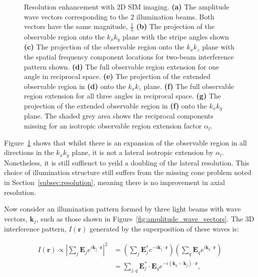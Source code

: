\begin{figure}
\begin{subfigure}[t]{0.5\textwidth}
		\caption{}
		\label{fig:3D_SIM_OTF_xy_expansion_w_double_rad_filled}
	\end{subfigure}
	\caption[Resolution enhancement with 2D SIM imaging]{Resolution enhancement 
		with 2D SIM imaging. \textbf{(a)} The amplitude wave vectors 
		corresponding to the 2 illumination beams. Both vectors have the 
		same magnitude, $\frac{1}{\lambda}$ \textbf{(b)} The projection of the 
		observable region onto the $k_{x}k_{y}$ plane with the stripe angles 
		shown \textbf{(c)} The projection of the observable region onto the 
		$k_{x}k_{z}$ plane with the spatial frequency component locations for
		two-beam interference pattern shown. \textbf{(d)} The full observable region 
		extension for one angle in reciprocal space. \textbf{(e)} The projection 
		of the extended observable region in \textbf{(d)} onto the $k_{x}k_{z}$ 
		plane. \textbf{(f)} The full observable region extension for all three angles in 
		reciprocal space. \textbf{(g)} The projection of the extended observable 
		region in \textbf{(f)} onto the $k_{x}k_{y}$ plane. The shaded grey area
		shows the reciprocal components missing for an isotropic observable region
		extension factor $\alpha_{l}$.}
	\label{fig:2D_SIM_visualisation}
\end{figure}

Figure~\ref{fig:3D_SIM_OTF_xy_expansion_w_double_rad_filled} shows
that whilst there is an expansion of the observable region in all
directions in the $k_{x}k_{y}$ plane, it is not a lateral isotropic 
extension by $\alpha_{l}$. Nonetheless, it is still suffienct to yeild 
a doubling of the lateral resolution\cite{gustafsson2000surpassing}.
This choice of illumination structure still suffers from the missing
cone problem noted in Section~\ref{subsec:resolution}, meaning there
is no improvement in axial resolution.

Now consider an illumination pattern formed by three light beams with
wave vectors, $\textbf{k}_{j}$, such as those shown in 
Figure~\ref{fig:amplitude_wave_vectors}. The 3D interference pattern, 
$I(\textbf{r})$ generated by the superposition of these waves is:

\begin{equation}\label{eq:3_beam_interference}
	\begin{split}
		I(\textbf{r}) \propto \left|\sum\limits_{j}{\textbf{E}_{j}e^{i\textbf{k}_j\cdot\textbf{r}}}\right|^{2} &= \left(\sum\limits_{j}{\textbf{E}^{*}_{j}e^{-i\textbf{k}_{j}\cdot\textbf{r}}}\right)
		\left(\sum\limits_{q}{\textbf{E}_{q}e^{i\textbf{k}_{q}\cdot\textbf{r}}}\right)\\
		&= \sum\limits_{j,q}{\textbf{E}^{*}_{j}\cdot\textbf{E}_{q}e^{-i\left(\textbf{k}_{q}-\textbf{k}_{j}\right)\cdot\textbf{r}}},
	\end{split}
\end{equation}


